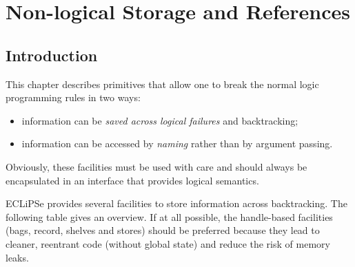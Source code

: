 %
%
%
%
%
%
%

\chapter{Non-logical Storage and References}
\label{chaparrays}

\section{Introduction}

This chapter describes primitives that allow one to break the normal logic
programming rules in two ways:
\begin{itemize}
\item information can be \emph{saved across logical failures} and backtracking;
\item information can be accessed by \emph{naming} rather than by argument
  passing.
\end{itemize}
Obviously, these facilities must be used with care and should always
be encapsulated in an interface that provides logical semantics.

ECLiPSe provides several facilities to store information across
backtracking.  The following table gives an overview.  If at all
possible, the handle-based facilities (bags, record, shelves and stores)
should be preferred because they lead to cleaner, reentrant code
(without global state) and reduce the risk of memory leaks.

